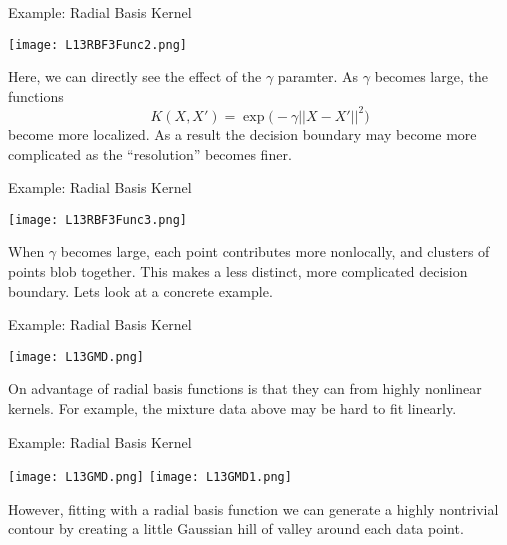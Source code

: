 \documentclass[10pt, table, dvipsnames,xcdraw]{beamer}
\begin{document}
\begin{frame}[fragile]{Example: Radial Basis Kernel}
  \begin{minipage}[t][0.6\textheight][t]{\textwidth}
	\centering \texttt{[image: L13RBF3Func2.png]}
  \end{minipage}
  \vfill
\begin{minipage}[t][0.4\textheight][t]{\textwidth}
Here, we can directly see the effect of the $\gamma$ paramter. As $\gamma$ becomes large, the functions 
$$
K(X,X')=\exp\big(-\gamma||X-X'||^2\big)
$$
become more localized. As a result the decision boundary may become more complicated as the ``resolution'' becomes finer. 
\end{minipage}
\end{frame}


\begin{frame}[fragile]{Example: Radial Basis Kernel}
  \begin{minipage}[t][0.6\textheight][t]{\textwidth}
	\centering \texttt{[image: L13RBF3Func3.png]}
  \end{minipage}
  \vfill
\begin{minipage}[t][0.4\textheight][t]{\textwidth}
When $\gamma$ becomes large, each point contributes more nonlocally, and clusters of points blob together. This makes a less distinct, more complicated decision boundary. Lets look at a concrete example. 
\end{minipage}
\end{frame}






\begin{frame}[fragile]{Example: Radial Basis Kernel}
  \begin{minipage}[t][0.6\textheight][t]{\textwidth}
	\centering \texttt{[image: L13GMD.png]}
  \end{minipage}
  \vfill
\begin{minipage}[t][0.4\textheight][t]{\textwidth}
On advantage of radial basis functions is that they can from highly nonlinear kernels. For example, the mixture data above may be hard to fit linearly. 
\end{minipage}
\end{frame}



\begin{frame}[fragile]{Example: Radial Basis Kernel}
  \begin{minipage}[t][0.6\textheight][t]{\textwidth}
	\centering \texttt{[image: L13GMD.png]}
	\texttt{[image: L13GMD1.png]}
  \end{minipage}
  \vfill
\begin{minipage}[t][0.4\textheight][t]{\textwidth}
However, fitting with a radial basis function we can generate a highly nontrivial contour by creating a little Gaussian hill of valley around each data point. 
\end{minipage}
\end{frame}
\end{document}
